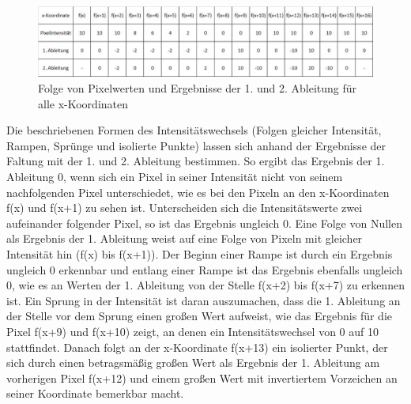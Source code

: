 \documentclass[ngerman,12pt]{article} %
\begin{document}
\begin{figure} [h!tb]
	\begin{center}
	\includegraphics[width=1\textwidth]{Faltung_Beispiel_Ergebnis}
	\caption[Folge von Pixeln mit Ergebnis der 1. und 2. Ableitung]{\label{pic:Faltung_Beispiel_Ergebnis}Folge von Pixelwerten und Ergebnisse der 1. und 2. Ableitung für alle x-Koordinaten}
	\end{center}
\end{figure}

Die beschriebenen Formen des Intensitätswechsels (Folgen gleicher Intensität, Rampen, Sprünge und isolierte Punkte) lassen sich anhand der Ergebnisse der Faltung mit der 1. und 2. Ableitung bestimmen. So ergibt das Ergebnis der 1. Ableitung 0, wenn sich ein Pixel in seiner Intensität nicht von seinem nachfolgenden Pixel unterschiedet, wie es bei den Pixeln an den x-Koordinaten f(x) und f(x+1) zu sehen ist. Unterscheiden sich die Intensitätswerte zwei aufeinander folgender Pixel, so ist das Ergebnis ungleich 0. Eine Folge von Nullen als Ergebnis der 1. Ableitung weist auf eine Folge von Pixeln mit gleicher Intensität hin (f(x) bis f(x+1)). Der Beginn einer Rampe ist durch ein Ergebnis ungleich 0 erkennbar und entlang einer Rampe ist das Ergebnis ebenfalls ungleich 0, wie es an Werten der 1. Ableitung von der Stelle f(x+2) bis f(x+7) zu erkennen ist. Ein Sprung in der Intensität ist daran auszumachen, dass die 1. Ableitung an der Stelle vor dem Sprung einen großen Wert aufweist, wie das Ergebnis für die Pixel f(x+9) und f(x+10) zeigt, an denen ein Intensitätswechsel von 0 auf 10 stattfindet. Danach folgt an der x-Koordinate f(x+13) ein isolierter Punkt, der sich durch einen betragsmäßig großen Wert als Ergebnis der 1. Ableitung am vorherigen Pixel f(x+12) und einem großen Wert mit invertiertem Vorzeichen an seiner Koordinate bemerkbar macht.\\
\end{document}

